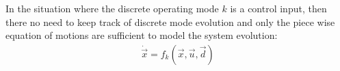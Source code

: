 
In the situation where the discrete operating mode $k$ is a control input, then there no need to keep track of discrete mode evolution and only the piece wise equation of motions are sufficient to model the system evolution:
%
\begin{align}
\dot{\vec{x}} = f_k( \vec{x} , \vec{u} , \vec{d} ) 
\end{align}


